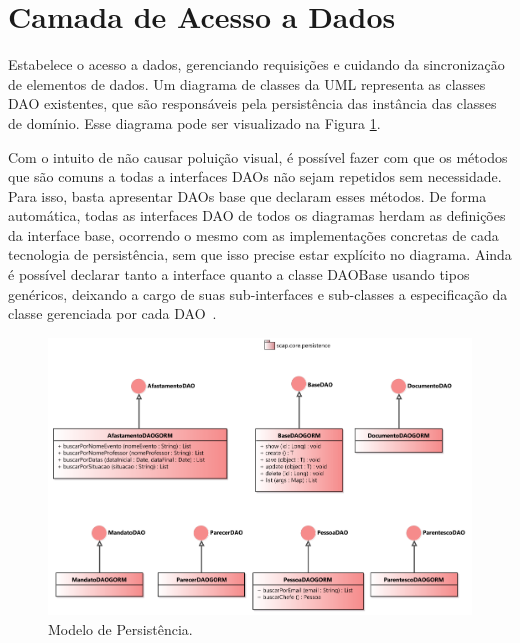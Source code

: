 \section{Camada de Acesso a Dados}
\label{sec-arquitetura-dados}


Estabelece o acesso a dados, gerenciando requisições e cuidando da sincronização de elementos de dados. Um diagrama de classes da UML representa as classes DAO existentes, que são responsáveis pela persistência das instância das classes de domínio. Esse diagrama pode ser visualizado na Figura \ref{figura-arquitetura-persistencia}.

Com o intuito de não causar poluição visual, é possível fazer com que os métodos que são comuns a todas a interfaces DAOs não sejam repetidos sem necessidade. Para isso, basta apresentar DAOs base que declaram esses métodos. De forma automática, todas as interfaces DAO de todos os diagramas herdam as definições da interface base, ocorrendo o mesmo com as implementações concretas de cada tecnologia de persistência, sem que isso precise estar explícito no diagrama. Ainda é possível declarar tanto a interface quanto a classe DAOBase usando tipos genéricos, deixando a cargo de suas sub-interfaces e sub-classes a especificação da classe gerenciada por cada DAO~\cite{souza:masterthesis07}. 

\begin{figure}[h]
	\centering
	\includegraphics[width=1\textwidth]{figuras/figura-arquitetura-persistencia.png}
	\caption{Modelo de Persistência.}
	\label{figura-arquitetura-persistencia}
\end{figure}

